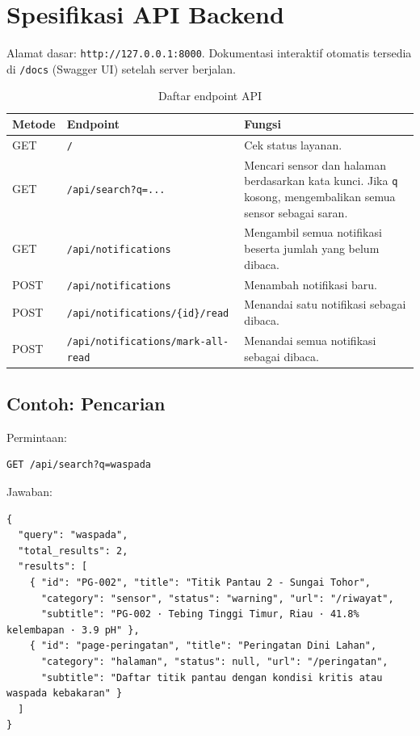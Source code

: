 \documentclass[11pt,a4paper]{article}
\newcommand{\kode}[1]{\texttt{#1}}
\begin{document}
\section{Spesifikasi API Backend}

Alamat dasar: \kode{http://127.0.0.1:8000}. Dokumentasi interaktif otomatis tersedia di
\kode{/docs} (Swagger UI) setelah server berjalan.

\begin{table}[H]
\centering
\caption{Daftar endpoint API}
\label{tab:api}
\begin{tabularx}{\linewidth}{@{}llL@{}}
\toprule
\textbf{Metode} & \textbf{Endpoint} & \textbf{Fungsi} \\
\midrule
GET  & \kode{/}                                   & Cek status layanan. \\
GET  & \kode{/api/search?q=...}                   & Mencari sensor dan halaman berdasarkan kata kunci. Jika \kode{q} kosong, mengembalikan semua sensor sebagai saran. \\
GET  & \kode{/api/notifications}                  & Mengambil semua notifikasi beserta jumlah yang belum dibaca. \\
POST & \kode{/api/notifications}                  & Menambah notifikasi baru. \\
POST & \kode{/api/notifications/\{id\}/read}      & Menandai satu notifikasi sebagai dibaca. \\
POST & \kode{/api/notifications/mark-all-read}    & Menandai semua notifikasi sebagai dibaca. \\
\bottomrule
\end{tabularx}
\end{table}

\subsection{Contoh: Pencarian}
Permintaan:
\begin{lstlisting}
GET /api/search?q=waspada
\end{lstlisting}
Jawaban:
\begin{lstlisting}
{
  "query": "waspada",
  "total_results": 2,
  "results": [
    { "id": "PG-002", "title": "Titik Pantau 2 - Sungai Tohor",
      "category": "sensor", "status": "warning", "url": "/riwayat",
      "subtitle": "PG-002 · Tebing Tinggi Timur, Riau · 41.8% kelembapan · 3.9 pH" },
    { "id": "page-peringatan", "title": "Peringatan Dini Lahan",
      "category": "halaman", "status": null, "url": "/peringatan",
      "subtitle": "Daftar titik pantau dengan kondisi kritis atau waspada kebakaran" }
  ]
}
\end{lstlisting}
\end{document}
